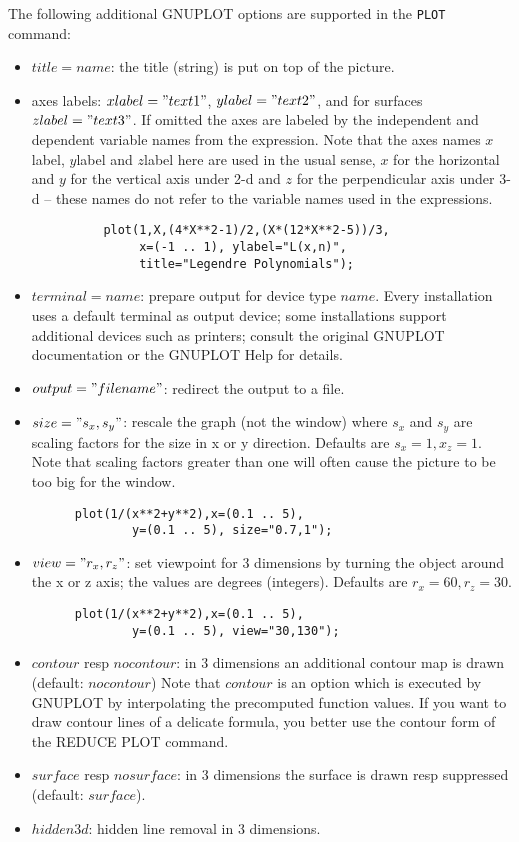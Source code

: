 The following additional GNUPLOT options are supported in the \verb+PLOT+ command:

\begin{itemize}
\item $title=name$: the title (string) is put on top
     of the picture. 

\item axes labels: $xlabel="text1"$, $ylabel="text2"$, and for
  surfaces $zlabel="text3"$. If omitted the axes are labeled
  by the independent and dependent variable names from the
  expression. Note that the axes names $x$label, $y$label and
  $z$label here are used in the usual sense, $x$ for the 
  horizontal and $y$ for the vertical axis under 2-d and
  $z$ for the perpendicular axis under 3-d -- these names
  do not refer to the variable names used in the expressions.

\begin{verbatim}
          plot(1,X,(4*X**2-1)/2,(X*(12*X**2-5))/3,
               x=(-1 .. 1), ylabel="L(x,n)",
               title="Legendre Polynomials");
\end{verbatim}

\item $terminal=name$: prepare output for device type $name$.
     Every installation uses a default terminal as output
     device; some installations support additional
     devices such as printers; consult the original
     GNUPLOT documentation or the GNUPLOT Help for details.
\item $output="filename"$: redirect the output to a file.

\item $size="s_x,s_y"$: rescale the graph (not the
      window) where $s_x$ and $s_y$ are scaling
     factors for the size in x or y
     direction. Defaults are $s_x=1,x_z=1$.
     Note that scaling factors greater than one
     will often cause the picture to be too big for
     the window.
\begin{verbatim}
      plot(1/(x**2+y**2),x=(0.1 .. 5),
              y=(0.1 .. 5), size="0.7,1");
\end{verbatim}
\item $view="r_x,r_z"$: set viewpoint for 3 dimensions 
     by turning the object around the x or z axis;
     the values are degrees (integers).
Defaults are $r_x=60,r_z=30$.
\begin{verbatim}
      plot(1/(x**2+y**2),x=(0.1 .. 5),
              y=(0.1 .. 5), view="30,130");
\end{verbatim}
\item  $contour$ resp $nocontour$: in 3 dimensions an 
       additional contour map is drawn (default: $nocontour$)
       Note that $contour$ is an option
       which is executed by GNUPLOT by interpolating the precomputed
       function values. If you want to draw contour lines of a 
       delicate formula, you better use the contour form of the
       REDUCE PLOT command.
\item $surface$ resp $nosurface$: in 3 dimensions the
       surface is drawn resp suppressed (default: $surface$).
\item $hidden3d$: hidden line removal in 3 dimensions.
\end{itemize}

